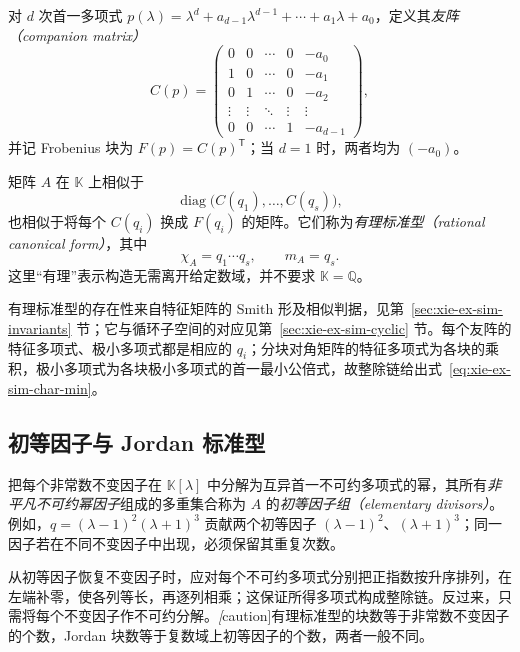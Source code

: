 \begin{definition}
对 $d$ 次首一多项式 $p(\lambda)=\lambda^d+a_{d-1}\lambda^{d-1}+\cdots+a_1\lambda+a_0$，定义其\emph{友阵（companion matrix）}
\[
 C(p)=\begin{pmatrix}
 0&0&\cdots&0&-a_0\\
 1&0&\cdots&0&-a_1\\
 0&1&\cdots&0&-a_2\\
 \vdots&\vdots&\ddots&\vdots&\vdots\\
 0&0&\cdots&1&-a_{d-1}
 \end{pmatrix},
\]
并记 Frobenius 块为 $F(p)=C(p)^{\mathsf T}$；当 $d=1$ 时，两者均为 $(-a_0)$。
\end{definition}

\begin{theorem}[有理标准型]
\label{thm:xie-ex-sim-rational}
矩阵 $A$ 在 $\mathbb K$ 上相似于
\[
 \operatorname{diag}\bigl(C(q_1),\ldots,C(q_s)\bigr),
\]
也相似于将每个 $C(q_i)$ 换成 $F(q_i)$ 的矩阵。它们称为\emph{有理标准型（rational canonical form）}，其中
\begin{equation}
 \chi_A=q_1\cdots q_s,
 \qquad m_A=q_s.
 \label{eq:xie-ex-sim-char-min}
\end{equation}
这里“有理”表示构造无需离开给定数域，并不要求 $\mathbb K=\mathbb Q$。
\end{theorem}

有理标准型的存在性来自特征矩阵的 Smith 形及相似判据，见第~\ref{sec:xie-ex-sim-invariants} 节；它与循环子空间的对应见第~\ref{sec:xie-ex-sim-cyclic} 节。每个友阵的特征多项式、极小多项式都是相应的 $q_i$；分块对角矩阵的特征多项式为各块的乘积，极小多项式为各块极小多项式的首一最小公倍式，故整除链给出式~\eqref{eq:xie-ex-sim-char-min}。

\subsection{初等因子与 Jordan 标准型}

\begin{definition}
把每个非常数不变因子在 $\mathbb K[\lambda]$ 中分解为互异首一不可约多项式的幂，其所有\emph{非平凡不可约幂因子}组成的多重集合称为 $A$ 的\emph{初等因子组（elementary divisors）}。例如，$q=(\lambda-1)^2(\lambda+1)^3$ 贡献两个初等因子 $(\lambda-1)^2$、$(\lambda+1)^3$；同一因子若在不同不变因子中出现，必须保留其重复次数。
\end{definition}

从初等因子恢复不变因子时，应对每个不可约多项式分别把正指数按升序排列，在左端补零，使各列等长，再逐列相乘；这保证所得多项式构成整除链。反过来，只需将每个不变因子作不可约分解。\emph[caution]{有理标准型的块数等于非常数不变因子的个数，Jordan 块数等于复数域上初等因子的个数，两者一般不同。}

